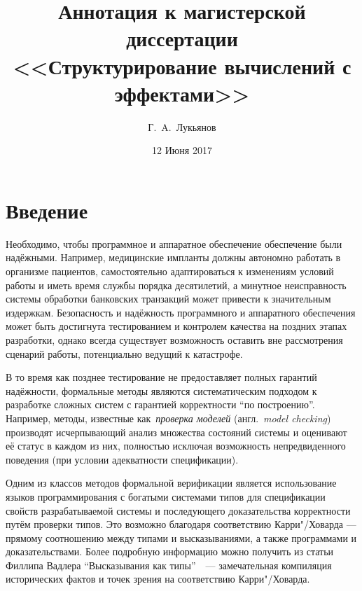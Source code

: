 \documentclass [fontsize=14pt, paper=a4, pagesize, DIV=calc]%
{article}
\begin{document}
\title{Аннотация к магистерской диссертации\\<<Структурирование вычислений с эффектами>>}
\author{Г.~A.~Лукьянов}
\date{12 Июня 2017}

\maketitle

\section{Введение}

Необходимо, чтобы программное и аппаратное обеспечение обеспечение были надёжными.
Например, медицинские импланты должны автономно работать в организме пациентов,
самостоятельно адаптироваться к изменениям условий работы и иметь время службы порядка
десятилетий, а минутное неисправность системы обработки банковских транзакций
может привести к значительным издержкам. Безопасность и надёжность программного и
аппаратного обеспечения может быть достигнута тестированием и контролем качества на
поздних этапах разработки, однако всегда существует возможность оставить вне
рассмотрения сценарий работы, потенциально ведущий к катастрофе.

В то время как позднее тестирование не предоставляет полных гарантий надёжности,
формальные методы являются систематическим подходом к разработке сложных систем
с гарантией корректности ``по построению''. Например, методы, известные
как~\emph{проверка моделей} (англ.~\emph{model checking}) производят исчерпывающий
анализ множества состояний системы и оценивают её статус в каждом из них, полностью
исключая возможность непредвиденного поведения (при условии адекватности спецификации).

Одним из классов методов формальной верификации является использование языков
программирования с богатыми системами типов для спецификации свойств разрабатываемой
системы и последующего доказательства корректности путём проверки типов.
Это возможно благодаря соответствию Карри"/Ховарда --- прямому соотношению между
типами и высказываниями, а также программами и доказательствами. Более подробную
информацию можно получить из статьи Филлипа Вадлера
``Высказывания как типы''~\cite{Wadler:2015:PT:2847579.2699407}~---
замечательная компиляция исторических фактов и точек зрения на
соответствию Карри"/Ховарда.
\end{document}
